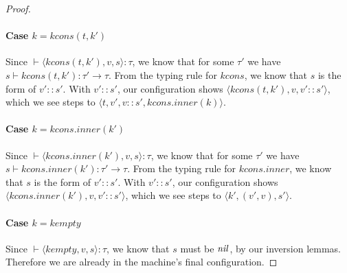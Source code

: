 \documentclass{article}
\begin{document}
\begin{proof}
 \paragraph{Case $k = kcons(t,k')$} Since $\vdash \langle kcons(t,k'), v, s \rangle : \tau$, we know that for some $\tau'$ we have $s \vdash kcons(t, k') : \tau' \rightarrow \tau$. From the typing rule for $kcons$, we know that $s$ is the form of $v'::s'$. With $v'::s'$, our configuration shows $\langle kcons (t, k'), v, v'::s' \rangle$, which we see steps to $\langle t,v',v::s', kcons.inner(k) \rangle$.

 \paragraph{Case $k = kcons.inner(k')$} Since $\vdash \langle kcons.inner(k'), v, s \rangle : \tau$, we know that for some $\tau'$ we have $s \vdash kcons.inner(k') : \tau' \rightarrow \tau$. From the typing rule for $kcons.inner$, we know that $s$ is the form of $v'::s'$. With $v'::s'$, our configuration shows $\langle kcons.inner (k'), v, v'::s' \rangle$, which we see steps to $\langle k', (v',v), s' \rangle$.

 \paragraph{Case $k = kempty$} Since $\vdash \langle kempty, v, s
 \rangle : \tau$, we know that $s$ must be $\mathit{nil}$, by our inversion
 lemmas. Therefore we are already in the machine's final
 configuration.

\end{proof}
\end{document}
